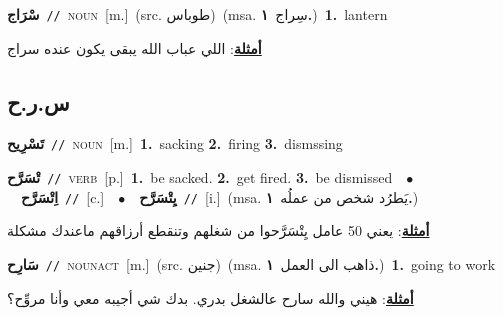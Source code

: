 \documentclass[10pt,a4paper,twoside]{article} %
\begin{document}
\begin{multicols}{2}
{\setlength\topsep{0pt}\textbf{\foreignlanguage{arabic}{سْرَاج}}\ {\color{gray}\texttt{//}\color{black}}\ \textsc{noun}\ [m.]\ (src. \color{gray}\foreignlanguage{arabic}{طوباس}\color{black})\ \color{gray}(msa. \foreignlanguage{arabic}{سِراج}~\foreignlanguage{arabic}{\textbf{١.}})\color{black}\ \textbf{1.}~lantern\  \begin{flushright}\color{gray}\foreignlanguage{arabic}{\textbf{\underline{\foreignlanguage{arabic}{أمثلة}}}: اللي عباب الله يبقى يكون عنده سراج}\end{flushright}\color{black}} \vspace{2mm}

\vspace{-3mm}
\subsection*{\color{blue}\foreignlanguage{arabic}{س.ر.ح}\color{blue}{}} 

{\setlength\topsep{0pt}\textbf{\foreignlanguage{arabic}{تَسْرِيح}}\ {\color{gray}\texttt{//}\color{black}}\ \textsc{noun}\ [m.]\ \textbf{1.}~sacking  \textbf{2.}~firing  \textbf{3.}~dismssing\ } \vspace{2mm}

{\setlength\topsep{0pt}\textbf{\foreignlanguage{arabic}{تْسَرَّح}}\ {\color{gray}\texttt{//}\color{black}}\ \textsc{verb}\ [p.]\ \textbf{1.}~be sacked.  \textbf{2.}~get fired.  \textbf{3.}~be dismissed\ \ $\bullet$\ \ \setlength\topsep{0pt}\textbf{\foreignlanguage{arabic}{اِتْسَرَّح}}\ {\color{gray}\texttt{//}\color{black}}\ [c.]\ \ $\bullet$\ \ \setlength\topsep{0pt}\textbf{\foreignlanguage{arabic}{يِتْسَرَّح}}\ {\color{gray}\texttt{//}\color{black}}\ [i.]\ \color{gray}(msa. \foreignlanguage{arabic}{يَطرُد شخص من عملُه}~\foreignlanguage{arabic}{\textbf{١.}})\color{black}\  \begin{flushright}\color{gray}\foreignlanguage{arabic}{\textbf{\underline{\foreignlanguage{arabic}{أمثلة}}}: يعني 50 عامل يِتْسَرَّحوا من شغلهم وتنقطع أرزاقهم ماعندك مشكلة}\end{flushright}\color{black}} \vspace{2mm}

{\setlength\topsep{0pt}\textbf{\foreignlanguage{arabic}{سَارِح}}\ {\color{gray}\texttt{//}\color{black}}\ \textsc{noun\textunderscore act}\ [m.]\ (src. \color{gray}\foreignlanguage{arabic}{جنين}\color{black})\ \color{gray}(msa. \foreignlanguage{arabic}{ذاهب الى العمل}~\foreignlanguage{arabic}{\textbf{١.}})\color{black}\ \textbf{1.}~going to work\  \begin{flushright}\color{gray}\foreignlanguage{arabic}{\textbf{\underline{\foreignlanguage{arabic}{أمثلة}}}: هيني والله سارح عالشغل بدري. بدك شي أجيبه معي وأنا مروِّح؟}\end{flushright}\color{black}} \vspace{2mm}


\end{multicols}
\end{document}
